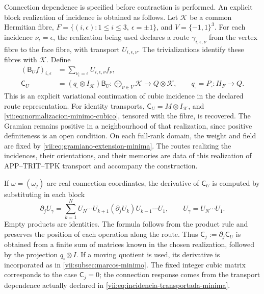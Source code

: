Connection dependence is specified before contraction is performed.
An explicit block realization of incidence is obtained as follows.
Let \(\mathcal K\) be a common Hermitian fibre,
\(F=\{(i,\epsilon):1\leq i\leq3,\ \epsilon=\pm1\}\), and
\(V=\{-1,1\}^3\). For each incidence \(\nu_i=\epsilon\),
the realization being used declares a route \(\gamma_{i,\epsilon,\nu}\)
from the vertex fibre to the face fibre, with transport
\(U_{i,\epsilon,\nu}\). The trivializations identify these
fibres with \(\mathcal K\). Define
\begin{equation}
 \begin{split}
 (\mathsf B_Uf)_{i,\epsilon}
   &=\sum_{\nu_i=\epsilon}U_{i,\epsilon,\nu}f_\nu,\\
 \mathsf C_U&=(q_\square\otimes I_{\mathcal K})\mathsf B_U:
   \bigoplus_{\nu\in V}\mathcal K\longrightarrow Q\otimes\mathcal K,
 \qquad q_\square=P_\square:H_F\to Q.
 \end{split}
 \label{vii:eq:incidencia-transportada-minima}
\end{equation}
This is an explicit variational continuation of cubic incidence in
the declared route representation. For identity transports,
\(\mathsf C_U=M\otimes I_{\mathcal K}\), and
\eqref{vii:eq:normalizacion-minimo-cubico}, tensored with the fibre,
is recovered. The Gramian remains positive in a neighbourhood of that
realization, since positive definiteness is an open condition. On each
full-rank domain, the weight and field are fixed by
\eqref{vii:eq:gramiano-extension-minima}. The routes realizing the
incidences, their orientations, and their memories are data of this
realization of APP--TRIT--TPK transport and accompany the construction.

If \(\omega=(\omega_j)\) are real connection coordinates,
the derivative of \(\mathsf C_U\) is computed by substituting
in each block
\begin{equation}
 \partial_j U_\gamma
 =\sum_{k=1}^{N}
    U_N\cdots U_{k+1}(\partial_jU_k)U_{k-1}\cdots U_1,
 \qquad U_\gamma=U_N\cdots U_1.
 \label{vii:eq:derivada-incidencia-rutas}
\end{equation}
Empty products are identities. The formula follows from the product
rule and preserves the position of each operation along the route.
Thus \(\mathsf C_j:=\partial_j\mathsf C_U\) is obtained from
a finite sum of matrices known in the chosen realization, followed
by the projection \(q_\square\otimes I\). If a moving quotient
is used, its derivative is incorporated as in
\ref{vii:subsec:marcos-minimo}. The fixed integer cubic matrix
corresponds to the case \(\mathsf C_j=0\); the connection response
comes from the transport dependence actually declared in
\eqref{vii:eq:incidencia-transportada-minima}.

